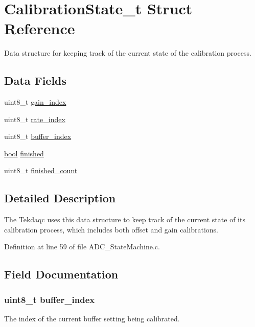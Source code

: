 \hypertarget{struct_calibration_state__t}{\section{Calibration\-State\-\_\-t Struct Reference}
\label{struct_calibration_state__t}
}


Data structure for keeping track of the current state of the calibration process.  


\subsection*{Data Fields}
\begin{DoxyCompactItemize}
\item 
uint8\-\_\-t \hyperlink{struct_calibration_state__t_a1726d9a3d7daf8e1b958e6a6b808a9de}{gain\-\_\-index}
\item 
uint8\-\_\-t \hyperlink{struct_calibration_state__t_a0f6cfefaa997e30d150fb53ceeb28d57}{rate\-\_\-index}
\item 
uint8\-\_\-t \hyperlink{struct_calibration_state__t_a2359bfa4a10109d5dcc2e002cb8ece47}{buffer\-\_\-index}
\item 
\hyperlink{group__data__types_ga0ecf26b576b9a54eca656b9be7ba6a06}{bool} \hyperlink{struct_calibration_state__t_a9324389a5cdc532c6417a87ccafe18ce}{finished}
\item 
uint8\-\_\-t \hyperlink{struct_calibration_state__t_adf2e3081566a821fce9f314e5d5348cc}{finished\-\_\-count}
\end{DoxyCompactItemize}


\subsection{Detailed Description}
The Tekdaqc uses this data structure to keep track of the current state of its calibration process, which includes both offset and gain calibrations. 

Definition at line 59 of file A\-D\-C\-\_\-\-State\-Machine.\-c.



\subsection{Field Documentation}
\hypertarget{struct_calibration_state__t_a2359bfa4a10109d5dcc2e002cb8ece47}{
\subsubsection[{buffer\-\_\-index}]{\setlength{\rightskip}{0pt plus 5cm}uint8\-\_\-t buffer\-\_\-index}}\label{struct_calibration_state__t_a2359bfa4a10109d5dcc2e002cb8ece47}
The index of the current buffer setting being calibrated. 

